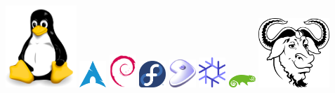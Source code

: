 \begin{frame}
    \frametitle{}

    \begin{center}
        \includegraphics[width=0.2\textwidth]{img/linux.png}
        \includegraphics[width=0.075\textwidth]{img/arch.png}
        \includegraphics[width=0.075\textwidth]{img/debian.png}
        \includegraphics[width=0.075\textwidth]{img/fedora.png}
        \includegraphics[width=0.075\textwidth]{img/gentoo.png}
        \includegraphics[width=0.075\textwidth]{img/nixos.png}
        \includegraphics[width=0.075\textwidth]{img/suse.png}
        \includegraphics[width=0.2\textwidth]{img/gnu.png}


\end{center}
\end{frame}
